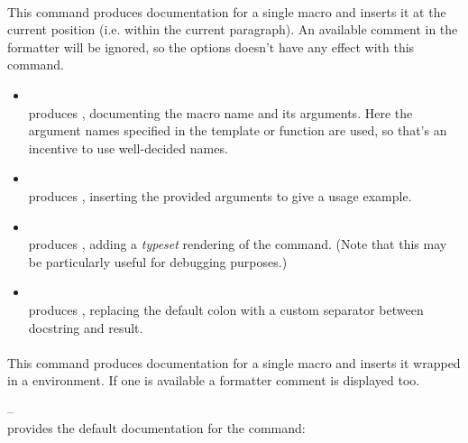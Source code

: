 \documentclass{scrartcl}
\begin{document}
\paragraph{\texttt{}}

This command produces documentation for a single macro and inserts it at the
current position (i.e. within the current paragraph).  An available comment in
the formatter will be ignored, so the  options doesn't have
any effect with this command.

\begin{itemize}
\item \texttt{}\\
produces , documenting the macro name and its
arguments.  Here the argument names specified in the template or function are
used, so that's an incentive to use well-decided names.
\item \texttt{}\\
produces , inserting
the provided arguments to give a usage example.
\item \texttt{}\\
produces ,
adding a \emph{typeset} rendering of the command. (Note that this may be
particularly useful for debugging purposes.)
\item \texttt{}\\
produces , replacing the default colon with a custom separator between docstring and result.
\end{itemize}


\paragraph{\texttt{}}

This command produces documentation for a single macro and inserts it wrapped in a  environment.  If one is available a formatter comment is displayed too.

\medskip
\noindent \texttt{} --\\
provides the default documentation for the command:
\end{document}
